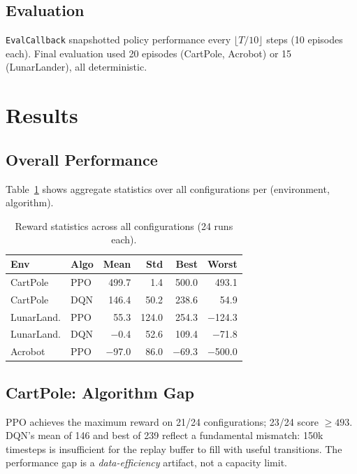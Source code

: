 \documentclass[10pt, a4paper, twocolumn]{article}
\begin{document}
\subsection{Evaluation}

\texttt{EvalCallback} snapshotted policy performance every
$\lfloor T/10 \rfloor$ steps (10 episodes each).
Final evaluation used 20 episodes (CartPole, Acrobot) or 15 (LunarLander),
all deterministic.

\section{Results}

\subsection{Overall Performance}

Table~\ref{tab:summary} shows aggregate statistics over all configurations per
(environment, algorithm).

\begin{table}[H]
\centering
\caption{Reward statistics across all configurations (24 runs each).}
\label{tab:summary}
\setlength{\tabcolsep}{3.5pt}
\begin{tabular}{llrrrr}
\toprule
\textbf{Env} & \textbf{Algo} & \textbf{Mean} & \textbf{Std} & \textbf{Best} & \textbf{Worst} \\
\midrule
CartPole   & PPO & 499.7 & 1.4   & 500.0  & 493.1  \\
CartPole   & DQN & 146.4 & 50.2  & 238.6  & 54.9   \\
\midrule
LunarLand. & PPO & 55.3  & 124.0 & 254.3  & −124.3 \\
LunarLand. & DQN & −0.4  & 52.6  & 109.4  & −71.8  \\
\midrule
Acrobot    & PPO & −97.0 & 86.0  & −69.3  & −500.0 \\
\bottomrule
\end{tabular}
\end{table}

\subsection{CartPole: Algorithm Gap}

PPO achieves the maximum reward on 21/24 configurations;
23/24 score $\geq 493$.
DQN's mean of 146 and best of 239 reflect a fundamental mismatch:
150k timesteps is insufficient for the replay buffer to fill with useful
transitions.
The performance gap is a \emph{data-efficiency} artifact, not a capacity limit.
\end{document}
